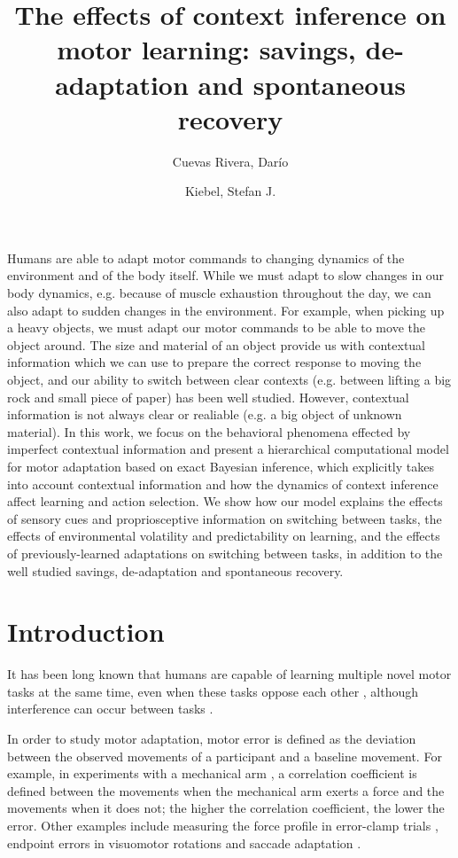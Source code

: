 \documentclass[a4paper,doc,floatsintext,natbib]{apa6}
\title{The effects of context inference on motor learning: savings, de-adaptation and spontaneous recovery}
\author[1]{Cuevas Rivera, Darío}
\author[1]{Kiebel, Stefan J.}
\affil[1]{Chair of Neuroimaging, Faculty of Psychology. Technische Universität Dresden, 01062 Dresden, Germany.}
\affiliation{~}
\begin{document}
\maketitle

Humans are able to adapt motor commands to changing dynamics of the environment and of the body itself. While we must adapt to slow changes in our body dynamics, e.g. because of muscle exhaustion throughout the day, we can also adapt to sudden changes in the environment. For example, when picking up a heavy objects, we must adapt our motor commands to be able to move the object around. The size and material of an object provide us with contextual information which we can use to prepare the correct response to moving the object, and our ability to switch between clear contexts (e.g. between lifting a big rock and small piece of paper) has been well studied. However, contextual information is not always clear or realiable (e.g. a big object of unknown material). In this work, we focus on the behavioral phenomena effected by imperfect contextual information and present a hierarchical computational model for motor adaptation based on exact Bayesian inference, which explicitly takes into account contextual information and how the dynamics of context inference affect learning and action selection. We show how our model explains the effects of sensory cues and propriosceptive information on switching between tasks, the effects of environmental volatility and predictability on learning, and the effects of previously-learned adaptations on switching between tasks, in addition to the well studied savings, de-adaptation and spontaneous recovery.

\section{Introduction}
It has been long known that humans are capable of learning multiple novel motor tasks at the same time, even when these tasks oppose each other \cite[e.g.][]{Gandolfo_Motor_1996,Shadmehr_Functional_1997,}, although interference can occur between tasks \cite[e.g.][]{Brashers-Krug_Consolidation_1996,Sing_Reduction_2010}.

In order to study motor adaptation, motor error is defined as the deviation between the observed movements of a participant and a baseline movement. For example, in experiments with a mechanical arm \cite[e.g.][]{Gandolfo_Motor_1996}, a correlation coefficient is defined between the movements when the mechanical arm exerts a force and the movements when it does not; the higher the correlation coefficient, the lower the error. Other examples include measuring the force profile in error-clamp trials \cite{Smith_Interacting_2006}, endpoint errors in visuomotor rotations \cite{Kim_Neural_2015} and saccade adaptation \cite{Catz_Cerebellardependent_2008}.
\end{document}
